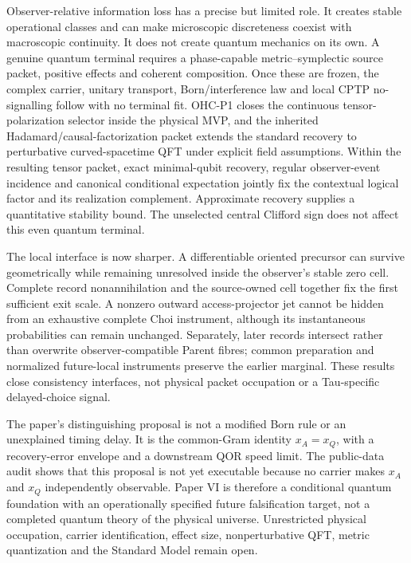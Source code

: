 \documentclass[11pt]{article}
\begin{document}
Observer-relative information loss has a precise but limited role.  It creates
stable operational classes and can make microscopic discreteness coexist with
macroscopic continuity.  It does not create quantum mechanics on its own.  A
genuine quantum terminal requires a phase-capable metric--symplectic source
packet, positive effects and coherent composition.  Once these are frozen,
the complex carrier, unitary transport, Born/interference law and local CPTP
no-signalling follow with no terminal fit.  OHC-P1 closes the continuous
tensor-polarization selector inside the physical MVP, and the inherited
Hadamard/causal-factorization packet extends the standard recovery to
perturbative curved-spacetime QFT under explicit field assumptions.
Within the resulting tensor packet, exact minimal-qubit recovery, regular
observer-event incidence and canonical conditional expectation jointly fix
the contextual logical factor and its realization complement. Approximate
recovery supplies a quantitative stability bound. The unselected central
Clifford sign does not affect this even quantum terminal.

The local interface is now sharper.  A differentiable oriented precursor can
survive geometrically while remaining unresolved inside the observer's stable
zero cell.  Complete record nonannihilation and the source-owned cell together
fix the first sufficient exit scale.  A nonzero outward access-projector jet
cannot be hidden from an exhaustive complete Choi instrument, although its
instantaneous probabilities can remain unchanged.  Separately, later records
intersect rather than overwrite observer-compatible Parent fibres; common
preparation and normalized future-local instruments preserve the earlier
marginal.  These results close consistency interfaces, not physical packet
occupation or a Tau-specific delayed-choice signal.

The paper's distinguishing proposal is not a modified Born rule or an
unexplained timing delay.  It is the common-Gram identity $x_A=x_Q$, with a
recovery-error envelope and a downstream QOR speed limit.  The public-data
audit shows that this proposal is not yet executable because no carrier makes
$x_A$ and $x_Q$ independently observable.  Paper VI is therefore a
conditional quantum foundation with an operationally specified future
falsification target, not a completed quantum theory of the physical
universe.  Unrestricted physical occupation, carrier identification, effect
size, nonperturbative QFT, metric
quantization and the Standard Model remain open.
\end{document}
